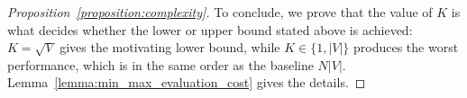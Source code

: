 \begin{proof}[Proposition~\ref{proposition:complexity}]
    To conclude, we prove that the value of $K$ is what decides whether the lower or upper bound stated above is achieved: $K=\sqrt{V}$ gives the motivating lower bound, while $K \in \{1, |V|\}$ produces the worst performance, which is in the same order as the baseline $N |V|$. Lemma~\ref{lemma:min_max_evaluation_cost} gives the details.
\end{proof}

